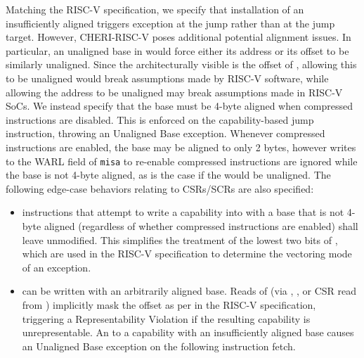 Matching the RISC-V specification, we specify that installation of an
insufficiently aligned \PC{} triggers exception at the jump rather than at
the jump target.
However, CHERI-RISC-V poses additional potential alignment issues.
In particular, an unaligned base in \PCC{} would force either its address
or its offset to be similarly unaligned.
Since the architecturally visible \PC{} is the offset of \PCC{}, allowing
this to be unaligned would break assumptions made by RISC-V software, while
allowing the address to be unaligned may break assumptions made in
RISC-V SoCs.
We instead specify that the \PCC{} base must be 4-byte aligned when compressed
instructions are disabled.
This is enforced on the capability-based jump instruction, throwing an
Unaligned Base exception.
Whenever compressed instructions are enabled, the \PCC{} base may be aligned to
only 2 bytes, however writes to the WARL field of \texttt{misa} to re-enable
compressed instructions are ignored while the \PCC{} base is not 4-byte
aligned, as is the case if the \PC{} would be unaligned.
The following edge-case behaviors relating to CSRs/SCRs are also specified:
\begin{itemize}
\item {} instructions that attempt to write a capability
      into \xTCC{} with a base that is not 4-byte aligned (regardless of whether
      compressed instructions are enabled) shall leave \xTCC{} unmodified.
      This simplifies the treatment of the lowest two bits of \xtvec{},
      which are used in the RISC-V specification to determine the vectoring
      mode of an exception.
\item \xEPCC{} can be written with an arbitrarily aligned base.
      Reads of \xEPCC{} (via \xRET{}, , or CSR read
      from \xepc{}) implicitly mask the offset as per \xepc{} in the RISC-V
      specification, triggering a Representability Violation if the resulting
      capability is unrepresentable.
      An \xRET{} to a capability with an insufficiently aligned base causes an
      Unaligned Base exception on the following instruction fetch.
\end{itemize}


